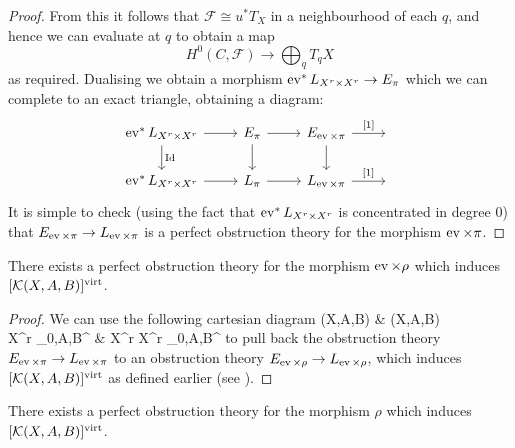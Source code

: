 \begin{proof}
From this it follows that $\mathcal{F} \cong u^* T_X$ in a neighbourhood of each $q$, and hence we can evaluate at $q$ to obtain a map
\begin{equation*} H^0(C,\mathcal{F}) \to \bigoplus_q T_q X \end{equation*}
as required. Dualising we obtain a morphism $\operatorname{ev}^* L_{X^r \times X^r} \rightarrow E_\pi$ which we can complete to an exact triangle, obtaining a diagram:
\begin{equation} \label{Diagram ev times pi and pi}
\begin{tikzcd}
\ev^* L_{X^r \times X^r} \ar[r] \ar[d,"\Id"] & E_\pi \ar[r] \ar[d] & E_{\ev \times \pi} \ar[r,"{[1]}"] \ar[d] & \, \\
\ev^* L_{X^r \times X^r} \ar[r] & L_\pi \ar[r] & L_{\ev \times \pi} \ar[r,"{[1]}"] & \,
\end{tikzcd}
\end{equation}
It is simple to check (using the fact that $\operatorname{ev}^* L_{X^r \times X^r}$ is concentrated in degree $0$) that $E_{\operatorname{ev} \times \pi} \rightarrow L_{\operatorname{ev} \times \pi}$ is a perfect obstruction theory for the morphism $\operatorname{ev} \times \pi$. \end{proof}

\begin{lemma} There exists a perfect obstruction theory for the morphism $\operatorname{ev} \times \rho$ which induces $[\mathcal{K}(X,A,B)]^{\operatorname{virt}}$.\end{lemma}

\begin{proof} We can use the following cartesian diagram
\bcd
{}(X,A,B) \ar[r,"h"]   & (X,A,B) \ar[d,"\ev \times \pi"] \\
X^r \times \MM_{0,A,B}^{}  & X^r \times X^r \times \MM_{0,A,B}^{}
\ecd
to pull back the obstruction theory $E_{\operatorname{ev} \times \pi} \rightarrow L_{\operatorname{ev} \times \pi}$ to an obstruction theory $E_{\operatorname{ev} \times \rho} \rightarrow L_{\operatorname{ev} \times \rho}$, which induces $[\mathcal{K}(X,A,B)]^{\operatorname{virt}}$ as defined earlier (see \cite[Proposition 7.2]{BF}). \end{proof}

\begin{lemma} There exists a perfect obstruction theory for the morphism $\rho$ which induces $[\mathcal{K}(X,A,B)]^{\operatorname{virt}}$.\end{lemma}

